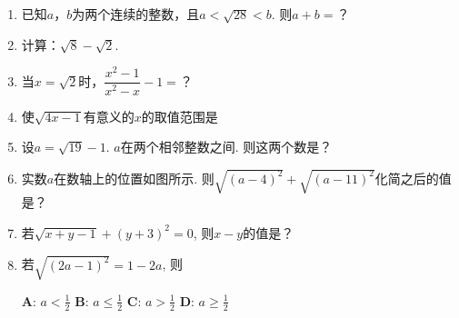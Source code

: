 \documentclass{article}
\begin{document}
\section{}

\begin{enumerate}

\item 已知$a$，$b$为两个连续的整数，且$a<\sqrt{28}<b$. 则$a+b=$？
\vspace{15em}

\item 计算：$\sqrt{8}-\sqrt{2}$.
\vspace{15em}

\item 当$x=\sqrt{2}$时，$\dfrac{x^2-1}{x^2-x}-1=$？
\vspace{15em}

\item 使$\sqrt{4x-1}$有意义的$x$的取值范围是
\vspace{15em}

\item 设$a=\sqrt{19}-1$. $a$在两个相邻整数之间. 则这两个数是？
\vspace{15em}

\item 实数$a$在数轴上的位置如图所示. 则$\sqrt{(a-4)^2}+\sqrt{(a-11)^2}$化简之后的值是？
\\ \vspace{1em}

\vspace{15em}

\item 若$\sqrt{x+y-1}+(y+3)^2=0$, 则$x-y$的值是？ 
\vspace{15em}

\item 若$\sqrt{(2a-1)^2}=1-2a$, 则

\noindent
$\mathbf{A}$: $a < \frac{1}{2}$ \hspace{1cm}
$\mathbf{B}$: $a \leqslant \frac{1}{2}$ \hspace{1cm}
$\mathbf{C}$: $a > \frac{1}{2}$ \hspace{1cm}
$\mathbf{D}$: $a \geqslant \frac{1}{2}$
\vspace{15em}


\end{enumerate}
\end{document}
